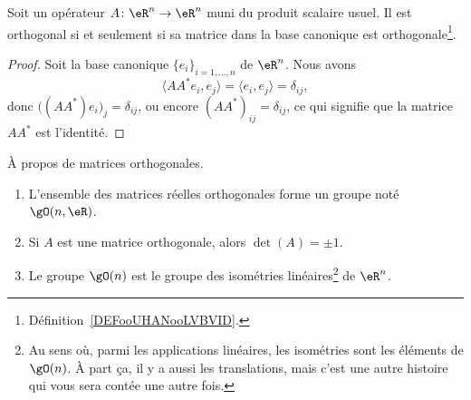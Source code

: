 \begin{lemma}       \label{LEMooSSALooSBFzJb}
	Soit un opérateur \( A\colon \eR^n\to \eR^n\) muni du produit scalaire usuel. Il est orthogonal si et seulement si sa matrice dans la base canonique est orthogonale\footnote{Définition~\ref{DEFooUHANooLVBVID}.}.
\end{lemma}

\begin{proof}
	Soit la base canonique \( \{ e_i \}_{i=1,\ldots, n}\) de \( \eR^n\). Nous avons
	\begin{equation}
		\langle AA^*e_i, e_j\rangle =\langle e_i, e_j\rangle =\delta_{ij},
	\end{equation}
	donc \( \big( (AA^*)e_i \big)_j=\delta_{ij}\), ou encore \( (AA^*)_{ij}=\delta_{ij}\), ce qui signifie que la matrice $AA^*$ est l'identité.
\end{proof}

\begin{proposition}     \label{PropKBCXooOuEZcS}
	À propos de matrices orthogonales.
	\begin{enumerate}
		\item       \label{ITEMooHSTAooIbVrwa}
		      L'ensemble des matrices réelles orthogonales forme un groupe noté \( \gO(n,\eR)\).
		\item
		      Si \( A\) est une matrice orthogonale, alors \( \det(A)=\pm 1\).
		\item       \label{ITEMooOWMBooHUatNb}
		      Le groupe \( \gO(n)\) est le groupe des isométries linéaires\footnote{Au sens où, parmi les applications linéaires, les isométries sont les éléments de \( \gO(n)\). À part ça, il y a aussi les translations, mais c'est une autre histoire qui vous sera contée une autre fois.} de \( \eR^n\).
	\end{enumerate}
\end{proposition}

